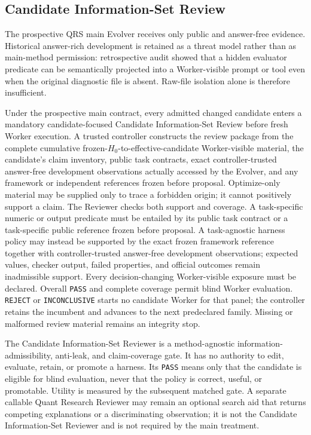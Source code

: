 \subsection{Candidate Information-Set Review}

The prospective QRS main Evolver receives only public and answer-free evidence.
Historical answer-rich development is retained as a threat model rather than
as main-method permission: retrospective audit showed that a hidden evaluator
predicate can be semantically projected into a Worker-visible prompt or tool
even when the original diagnostic file is absent. Raw-file isolation alone is
therefore insufficient.

Under the prospective main contract, every admitted changed candidate enters a
mandatory candidate-focused Candidate Information-Set Review before fresh
Worker execution. A trusted controller constructs the review package from the
complete cumulative frozen-$H_0$-to-effective-candidate Worker-visible
material, the candidate's claim inventory, public task contracts, exact
controller-trusted answer-free development
observations actually accessed by the Evolver, and any framework or independent
references frozen before proposal.
Optimize-only material may be supplied only to trace a forbidden origin; it
cannot positively support a claim. The Reviewer checks both support and
coverage. A task-specific numeric or output predicate must be entailed by its
public task contract or a task-specific public reference frozen before
proposal. A task-agnostic harness policy may instead be supported by the exact
frozen framework reference together with controller-trusted answer-free
development observations; expected values, checker output, failed properties,
and official outcomes remain inadmissible support. Every decision-changing
Worker-visible exposure must be declared. Overall \texttt{PASS} and complete
coverage permit blind Worker evaluation. \texttt{REJECT} or
\texttt{INCONCLUSIVE} starts no candidate Worker for that panel; the controller
retains the incumbent and advances to the next predeclared family. Missing or
malformed review material remains an integrity stop.

The Candidate Information-Set Reviewer is a method-agnostic information-
admissibility, anti-leak, and claim-coverage gate. It has no authority to edit,
evaluate, retain, or promote a harness. Its \texttt{PASS} means only that the
candidate is eligible for blind evaluation, never that the policy is correct,
useful, or promotable. Utility is measured by the subsequent matched gate. A
separate callable Quant Research Reviewer may remain an optional search aid
that returns competing explanations or a discriminating observation; it is
not the Candidate Information-Set Reviewer and is not required by the main
treatment.

